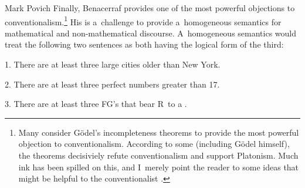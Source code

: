 \begin{artengenv}{Mark Povich}
Finally, Benacerraf
\parencite*[][]{benacerraf_mathematical_1973} %
 provides one of the most powerful objections to conventionalism.\footnote{Many consider Gödel's incompleteness theorems to provide the most powerful objection to conventionalism. According to some (including Gödel himself), the theorems decisiviely refute conventionalism and support Platonism. Much ink has been spilled on this, and I~merely point the reader to some ideas that might be helpful to the conventionalist 
\parencites[][]{moore_more_1999}[][]{floyd_note_2000}[][]{stalnaker_considering_2001}[][]{awodey_how_2004}[][]{berto_goparadox_2009}[][]{lampert_wittgenstein_2018}[][]{warren_shadows_2020}. %
 } His is a~challenge to provide a~homogeneous semantics for mathematical and non-mathematical discourse. A~homogeneous semantics would treat the following two sentences as both having the logical form of the third:

1. There are at least three large cities older than New York.

2. There are at least three perfect numbers greater than 17.

3. There are at least three FG's that bear R~to a
\parencite[][p.663]{benacerraf_mathematical_1973}.%



\end{artengenv}
